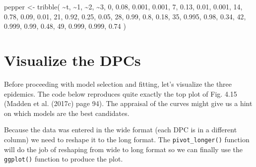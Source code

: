 \documentclass[
  letterpaper,
  DIV=11,
  numbers=noendperiod]{scrreprt}
\newenvironment{Shaded}{\begin{snugshade}}{\end{snugshade}}
\newcommand{\AttributeTok}[1]{\textcolor[rgb]{0.40,0.45,0.13}{#1}}
\newcommand{\DecValTok}[1]{\textcolor[rgb]{0.68,0.00,0.00}{#1}}
\newcommand{\FloatTok}[1]{\textcolor[rgb]{0.68,0.00,0.00}{#1}}
\newcommand{\FunctionTok}[1]{\textcolor[rgb]{0.28,0.35,0.67}{#1}}
\newcommand{\NormalTok}[1]{\textcolor[rgb]{0.00,0.23,0.31}{#1}}
\newcommand{\OtherTok}[1]{\textcolor[rgb]{0.00,0.23,0.31}{#1}}
\newcommand{\SpecialCharTok}[1]{\textcolor[rgb]{0.37,0.37,0.37}{#1}}
\newcommand{\StringTok}[1]{\textcolor[rgb]{0.13,0.47,0.30}{#1}}
\begin{document}
\begin{Shaded}
\begin{Highlighting}[]
\NormalTok{pepper }\OtherTok{\textless{}{-}} 
  \FunctionTok{tribble}\NormalTok{(}
   \SpecialCharTok{\textasciitilde{}}\NormalTok{t,  }\SpecialCharTok{\textasciitilde{}}\StringTok{\textasciigrave{}}\AttributeTok{1}\StringTok{\textasciigrave{}}\NormalTok{,  }\SpecialCharTok{\textasciitilde{}}\StringTok{\textasciigrave{}}\AttributeTok{2}\StringTok{\textasciigrave{}}\NormalTok{,  }\SpecialCharTok{\textasciitilde{}}\StringTok{\textasciigrave{}}\AttributeTok{3}\StringTok{\textasciigrave{}}\NormalTok{,}
   \DecValTok{0}\NormalTok{,  }\FloatTok{0.08}\NormalTok{, }\FloatTok{0.001}\NormalTok{, }\FloatTok{0.001}\NormalTok{,}
   \DecValTok{7}\NormalTok{,  }\FloatTok{0.13}\NormalTok{,  }\FloatTok{0.01}\NormalTok{, }\FloatTok{0.001}\NormalTok{,}
  \DecValTok{14}\NormalTok{,  }\FloatTok{0.78}\NormalTok{,  }\FloatTok{0.09}\NormalTok{,  }\FloatTok{0.01}\NormalTok{,}
  \DecValTok{21}\NormalTok{,  }\FloatTok{0.92}\NormalTok{,  }\FloatTok{0.25}\NormalTok{,  }\FloatTok{0.05}\NormalTok{,}
  \DecValTok{28}\NormalTok{,  }\FloatTok{0.99}\NormalTok{,   }\FloatTok{0.8}\NormalTok{,  }\FloatTok{0.18}\NormalTok{,}
  \DecValTok{35}\NormalTok{, }\FloatTok{0.995}\NormalTok{,  }\FloatTok{0.98}\NormalTok{,  }\FloatTok{0.34}\NormalTok{,}
  \DecValTok{42}\NormalTok{, }\FloatTok{0.999}\NormalTok{,  }\FloatTok{0.99}\NormalTok{,  }\FloatTok{0.48}\NormalTok{,}
  \DecValTok{49}\NormalTok{, }\FloatTok{0.999}\NormalTok{, }\FloatTok{0.999}\NormalTok{,  }\FloatTok{0.74}
\NormalTok{  ) }
\end{Highlighting}
\end{Shaded}

\hypertarget{visualize-the-dpcs}{%
\section{Visualize the DPCs}\label{visualize-the-dpcs}}

Before proceeding with model selection and fitting, let's visualize the
three epidemics. The code below reproduces quite exactly the top plot of
Fig. 4.15 (Madden et al. (2017c) page 94). The appraisal of the curves
might give us a hint on which models are the best candidates.

Because the data was entered in the wide format (each DPC is in a
different column) we need to reshape it to the long format. The
\texttt{pivot\_longer()} function will do the job of reshaping from wide
to long format so we can finally use the \texttt{ggplot()} function to
produce the plot.
\end{document}
